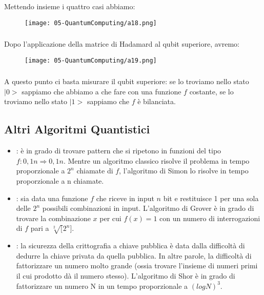 \subsubsection{}
Mettendo insieme i quattro casi abbiamo:

\begin{figure}[!h]
    \centering
    \texttt{[image: 05-QuantumComputing/a18.png]}
\end{figure}
\subsubsection{}
Dopo l’applicazione della matrice di Hadamard al qubit
superiore, avremo:
\begin{figure}[!h]
    \centering
    \texttt{[image: 05-QuantumComputing/a19.png]}
\end{figure}
\subsubsection{}
A questo punto ci basta misurare il qubit superiore: se lo troviamo
nello stato $|0>$ sappiamo che abbiamo a che fare con una funzione $f$
costante, se lo troviamo nello stato $|1>$ sappiamo che $f$ è bilanciata.


\subsection{Altri Algoritmi Quantistici}

\begin{itemize}
\item {}: è in grado di trovare pattern che si ripetono in
funzioni del tipo $f: {0,1}n \Rightarrow {0,1}n$. Mentre un algoritmo classico
risolve il problema in tempo proporzionale a $2^n$ chiamate di $f$,
l’algoritmo di Simon lo risolve in tempo proporzionale a n chiamate.
\item {}: sia data una funzione $f$ che riceve in input $n$ bit
e restituisce 1 per una sola delle $2^n$ possibili combinazioni in input.
L’algoritmo di Grover è in grado di trovare la combinazione $x$ per cui
$f(x) = 1$ con un numero di interrogazioni di $f$ pari a $\sqrt[2][2^n]$.
\item {}: la sicurezza della crittografia a chiave pubblica è
data dalla difficoltà di dedurre la chiave privata da quella pubblica. In
altre parole, la difficoltà di fattorizzare un numero molto grande (ossia
trovare l’insieme di numeri primi il cui prodotto dà il numero stesso).
L’algoritmo di Shor è in grado di fattorizzare un numero N in un
tempo proporzionale a $(log N)^3$.
\end{itemize}

